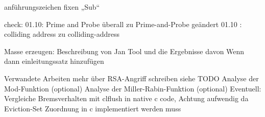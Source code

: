 anführungszeichen fixen „Sub“





check: 01.10: Prime and Probe überall zu Prime-and-Probe geändert
01.10 : colliding address zu colliding-address

Masse erzeugen:
Beschreibung von Jan Tool und die Ergebnisse davon
Wenn dann einleitungssatz hinzufügen

Verwandete Arbeiten mehr über RSA-Angriff schreiben siehe TODO
Analyse der Mod-Funktion (optional)
Analyse der Miller-Rabin-Funktion (optional)
Eventuell: Vergleiche Bremsverhalten mit clflush in native c code,
Achtung aufwendig da Eviction-Set Zuordnung in c implementiert werden muss



